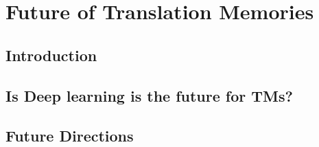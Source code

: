 \chapter{\label{cha:future}Future of Translation Memories}

\section{Introduction}


\section{Is Deep learning is the future for TMs?}

\section{Future Directions}